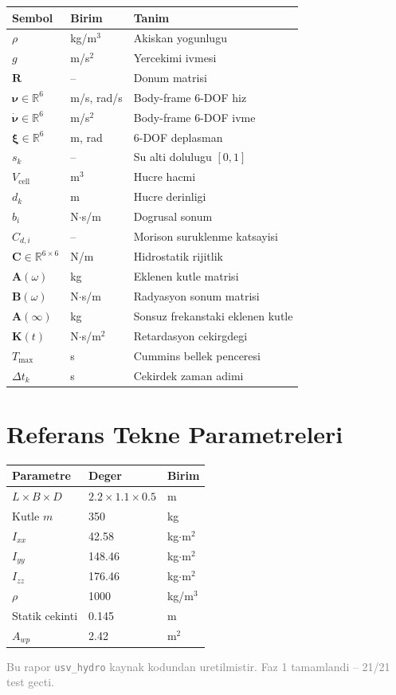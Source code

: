 \documentclass[12pt,a4paper]{article}
\newcommand{\nuvec}{\boldsymbol{\nu}}
\newcommand{\nudot}{\dot{\boldsymbol{\nu}}}
\newcommand{\xivec}{\boldsymbol{\xi}}
\newcommand{\Kvec}{\mathbf{K}}
\newcommand{\Cvec}{\mathbf{C}}
\newcommand{\Avec}{\mathbf{A}}
\newcommand{\Bvec}{\mathbf{B}}
\newcommand{\Ainf}{\mathbf{A}(\infty)}
\begin{document}
\begin{table}[H]
  \centering
  \begin{tabularx}{\linewidth}{llX}
    \toprule
    \textbf{Sembol} & \textbf{Birim} & \textbf{Tanim} \\
    \midrule
    $\rho$ & kg/m$^3$ & Akiskan yogunlugu \\
    $g$ & m/s$^2$ & Yercekimi ivmesi \\
    $\mathbf{R}$ & -- & Donum matrisi \\
    $\nuvec\in\mathbb{R}^6$ & m/s, rad/s & Body-frame 6-DOF hiz \\
    $\nudot\in\mathbb{R}^6$ & m/s$^2$ & Body-frame 6-DOF ivme \\
    $\xivec\in\mathbb{R}^6$ & m, rad & 6-DOF deplasman \\
    $s_k$ & -- & Su alti dolulugu $[0,1]$ \\
    $V_{\text{cell}}$ & m$^3$ & Hucre hacmi \\
    $d_k$ & m & Hucre derinligi \\
    $b_i$ & N$\cdot$s/m & Dogrusal sonum \\
    $C_{d,i}$ & -- & Morison suruklenme katsayisi \\
    $\Cvec\in\mathbb{R}^{6\times6}$ & N/m & Hidrostatik rijitlik \\
    $\Avec(\omega)$ & kg & Eklenen kutle matrisi \\
    $\Bvec(\omega)$ & N$\cdot$s/m & Radyasyon sonum matrisi \\
    $\Ainf$ & kg & Sonsuz frekanstaki eklenen kutle \\
    $\Kvec(t)$ & N$\cdot$s/m$^2$ & Retardasyon cekirgdegi \\
    $T_{\max}$ & s & Cummins bellek penceresi \\
    $\Delta t_k$ & s & Cekirdek zaman adimi \\
    \bottomrule
  \end{tabularx}
\end{table}

\section{Referans Tekne Parametreleri}

\begin{table}[H]
  \centering
  \begin{tabular}{lll}
    \toprule
    \textbf{Parametre} & \textbf{Deger} & \textbf{Birim} \\
    \midrule
    $L \times B \times D$ & $2.2\times 1.1\times 0.5$ & m \\
    Kutle $m$ & 350 & kg \\
    $I_{xx}$ & 42.58 & kg$\cdot$m$^2$ \\
    $I_{yy}$ & 148.46 & kg$\cdot$m$^2$ \\
    $I_{zz}$ & 176.46 & kg$\cdot$m$^2$ \\
    $\rho$ & 1000 & kg/m$^3$ \\
    Statik cekinti & 0.145 & m \\
    $A_{wp}$ & 2.42 & m$^2$ \\
    \bottomrule
  \end{tabular}
\end{table}

\vfill
\begin{center}
  \small\textcolor{gray}{
  Bu rapor \texttt{usv\_hydro} kaynak kodundan uretilmistir.
  Faz 1 tamamlandi -- 21/21 test gecti.
  }
\end{center}
\end{document}
